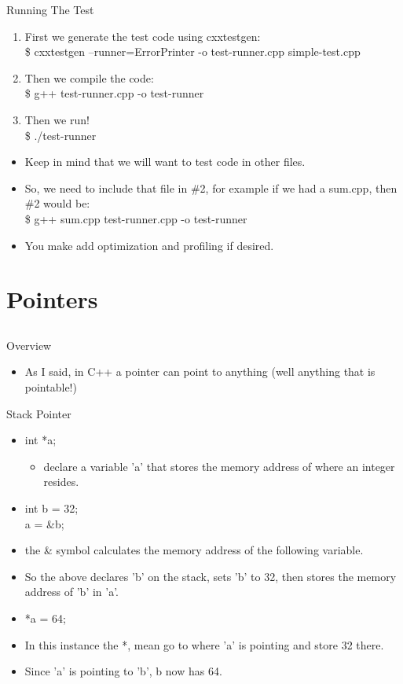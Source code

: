 \documentclass{beamer}
\begin{document}
\begin{frame}{Running The Test}
\begin{enumerate}
\item First we generate the test code using cxxtestgen: \\
\$ cxxtestgen --runner=ErrorPrinter -o test-runner.cpp simple-test.cpp 
\item Then we compile the code: \\
\$ g++ test-runner.cpp -o test-runner
\item Then we run! \\
\$ ./test-runner
\end{enumerate}
\begin{itemize}
\item Keep in mind that we will want to test code in other files.
\item So, we need to include that file in \#2, for example if we had a sum.cpp, then \#2 would be:\\ 
\$ g++ sum.cpp test-runner.cpp -o test-runner
\item You make add optimization and profiling if desired.
\end{itemize}
\end{frame}


\section{Pointers}
\subsection{}

\begin{frame}{Overview}
\begin{itemize}
\item As I said, in C++ a pointer can point to anything (well anything that is pointable!)
\end{itemize}
\end{frame}

\begin{frame}{Stack Pointer}
\begin{itemize}
\item int *a;
\begin{itemize}
\item declare a variable 'a' that stores the memory address of where an integer resides.
\end{itemize}
\item int b = 32; \\
a = \&b;
\item the \& symbol calculates the memory address of the following variable.
\item So the above declares 'b' on the stack, sets 'b' to 32, then stores the memory address of 'b' in 'a'.
\item *a = 64;
\item In this instance the *, mean go to where 'a' is pointing and store 32 there.
\item Since 'a' is pointing to 'b', b now has 64.
\end{itemize}
\end{frame}
\end{document}
